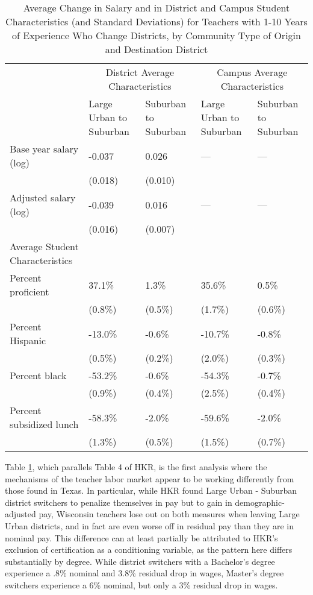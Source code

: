 \documentclass[]{article}
\begin{document}
\begin{table}[htbp]
\centering
\begin{tabular}{lp{}p{}p{}p{}}
  \hline
 & \multicolumn{2}{c}{District Average Characteristics} & \multicolumn{2}{c}{Campus Average Characteristics}\\ \cline{2-5}
 & Large Urban to Suburban & Suburban to Suburban & Large Urban to Suburban & Suburban to Suburban \\
  \hline
Base year salary (log) & -0.037 & 0.026 & --- & --- \\ 
   & (0.018) & (0.010) &  &  \\ 
  Adjusted salary (log) & -0.039 & 0.016 & --- & --- \\ 
   & (0.016) & (0.007) &  &  \\ 
Average Student Characteristics & & & & \\
  \quad Percent proficient & 37.1\% & 1.3\% & 35.6\% & 0.5\% \\ 
   & (0.8\%) & (0.5\%) & (1.7\%) & (0.6\%) \\ 
  \quad Percent Hispanic & -13.0\% & -0.6\% & -10.7\% & -0.8\% \\ 
   & (0.5\%) & (0.2\%) & (2.0\%) & (0.3\%) \\ 
  \quad Percent black & -53.2\% & -0.6\% & -54.3\% & -0.7\% \\ 
   & (0.9\%) & (0.4\%) & (2.5\%) & (0.4\%) \\ 
  \quad Percent subsidized lunch & -58.3\% & -2.0\% & -59.6\% & -2.0\% \\ 
   & (1.3\%) & (0.5\%) & (1.5\%) & (0.7\%) \\ 
   \hline
\end{tabular}
\caption{Average Change in Salary and in District and Campus Student Characteristics (and Standard Deviations) for Teachers with 1-10 Years of Experience Who Change Districts, by Community Type of Origin and Destination District} 
\label{tbl:change_by_urb}
\end{table}

Table \ref{tbl:change_by_urb}, which parallels Table 4 of HKR, is the
first analysis where the mechanisms of the teacher labor market appear
to be working differently from those found in Texas. In particular,
while HKR found Large Urban - Suburban district switchers to penalize
themselves in pay but to gain in demographic-adjusted pay, Wisconsin
teachers lose out on both measures when leaving Large Urban districts,
and in fact are even worse off in residual pay than they are in nominal
pay. This difference can at least partially be attributed to HKR's
exclusion of certification as a conditioning variable, as the pattern
here differs substantially by degree. While district switchers with a
Bachelor's degree experience a .8\% nominal and 3.8\% residual drop in
wages, Master's degree switchers experience a 6\% nominal, but only a
3\% residual drop in wages.
\end{document}
